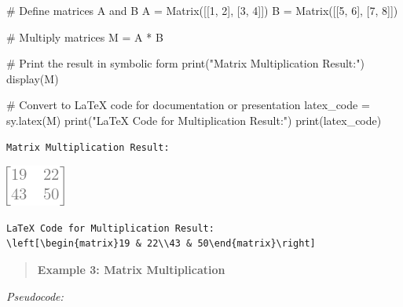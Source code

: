 \documentclass[
  letterpaper,
  DIV=11,
  numbers=noendperiod]{scrreprt}
\newenvironment{Shaded}{\begin{snugshade}}{\end{snugshade}}
\newcommand{\BuiltInTok}[1]{\textcolor[rgb]{0.00,0.23,0.31}{#1}}
\newcommand{\CommentTok}[1]{\textcolor[rgb]{0.37,0.37,0.37}{#1}}
\newcommand{\DecValTok}[1]{\textcolor[rgb]{0.68,0.00,0.00}{#1}}
\newcommand{\NormalTok}[1]{\textcolor[rgb]{0.00,0.23,0.31}{#1}}
\newcommand{\OperatorTok}[1]{\textcolor[rgb]{0.37,0.37,0.37}{#1}}
\newcommand{\StringTok}[1]{\textcolor[rgb]{0.13,0.47,0.30}{#1}}
\theoremstyle{plain}
\theoremstyle{definition}
\theoremstyle{remark}
\begin{document}
\begin{Shaded}
\begin{Highlighting}[]
\CommentTok{\# Define matrices A and B}
\NormalTok{A }\OperatorTok{=}\NormalTok{ Matrix([[}\DecValTok{1}\NormalTok{, }\DecValTok{2}\NormalTok{], [}\DecValTok{3}\NormalTok{, }\DecValTok{4}\NormalTok{]])}
\NormalTok{B }\OperatorTok{=}\NormalTok{ Matrix([[}\DecValTok{5}\NormalTok{, }\DecValTok{6}\NormalTok{], [}\DecValTok{7}\NormalTok{, }\DecValTok{8}\NormalTok{]])}

\CommentTok{\# Multiply matrices}
\NormalTok{M }\OperatorTok{=}\NormalTok{ A }\OperatorTok{*}\NormalTok{ B}

\CommentTok{\# Print the result in symbolic form}
\BuiltInTok{print}\NormalTok{(}\StringTok{"Matrix Multiplication Result:"}\NormalTok{)}
\NormalTok{display(M)}

\CommentTok{\# Convert to LaTeX code for documentation or presentation}
\NormalTok{latex\_code }\OperatorTok{=}\NormalTok{ sy.latex(M)}
\BuiltInTok{print}\NormalTok{(}\StringTok{"LaTeX Code for Multiplication Result:"}\NormalTok{)}
\BuiltInTok{print}\NormalTok{(latex\_code)}
\end{Highlighting}
\end{Shaded}

\begin{verbatim}
Matrix Multiplication Result:
\end{verbatim}

\includegraphics{module_1_files/figure-pdf/cell-5-output-2.png}

\begin{verbatim}
LaTeX Code for Multiplication Result:
\left[\begin{matrix}19 & 22\\43 & 50\end{matrix}\right]
\end{verbatim}

\begin{quote}
\textbf{Example 3: Matrix Multiplication}
\end{quote}

\emph{Pseudocode:}
\end{document}
